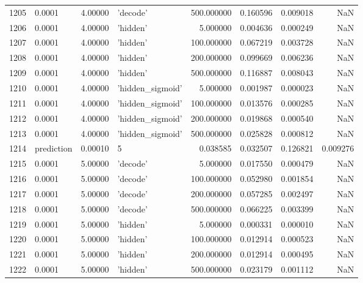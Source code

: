 \documentclass[10pt,a4paper]{article}
\begin{document}
\begin{tabular}{llrlrrrr}
1205 &      0.0001 &   4.00000 &           'decode' &  500.000000 &  0.160596 &  0.009018 &       NaN \\
1206 &      0.0001 &   4.00000 &           'hidden' &    5.000000 &  0.004636 &  0.000249 &       NaN \\
1207 &      0.0001 &   4.00000 &           'hidden' &  100.000000 &  0.067219 &  0.003728 &       NaN \\
1208 &      0.0001 &   4.00000 &           'hidden' &  200.000000 &  0.099669 &  0.006236 &       NaN \\
1209 &      0.0001 &   4.00000 &           'hidden' &  500.000000 &  0.116887 &  0.008043 &       NaN \\
1210 &      0.0001 &   4.00000 &   'hidden\_sigmoid' &    5.000000 &  0.001987 &  0.000023 &       NaN \\
1211 &      0.0001 &   4.00000 &   'hidden\_sigmoid' &  100.000000 &  0.013576 &  0.000285 &       NaN \\
1212 &      0.0001 &   4.00000 &   'hidden\_sigmoid' &  200.000000 &  0.019868 &  0.000540 &       NaN \\
1213 &      0.0001 &   4.00000 &   'hidden\_sigmoid' &  500.000000 &  0.025828 &  0.000812 &       NaN \\
1214 &  prediction &   0.00010 &                  5 &    0.038585 &  0.032507 &  0.126821 &  0.009276 \\
1215 &      0.0001 &   5.00000 &           'decode' &    5.000000 &  0.017550 &  0.000479 &       NaN \\
1216 &      0.0001 &   5.00000 &           'decode' &  100.000000 &  0.052980 &  0.001854 &       NaN \\
1217 &      0.0001 &   5.00000 &           'decode' &  200.000000 &  0.057285 &  0.002497 &       NaN \\
1218 &      0.0001 &   5.00000 &           'decode' &  500.000000 &  0.066225 &  0.003399 &       NaN \\
1219 &      0.0001 &   5.00000 &           'hidden' &    5.000000 &  0.000331 &  0.000010 &       NaN \\
1220 &      0.0001 &   5.00000 &           'hidden' &  100.000000 &  0.012914 &  0.000523 &       NaN \\
1221 &      0.0001 &   5.00000 &           'hidden' &  200.000000 &  0.012914 &  0.000495 &       NaN \\
1222 &      0.0001 &   5.00000 &           'hidden' &  500.000000 &  0.023179 &  0.001112 &       NaN \\

\end{tabular}
\end{document}
